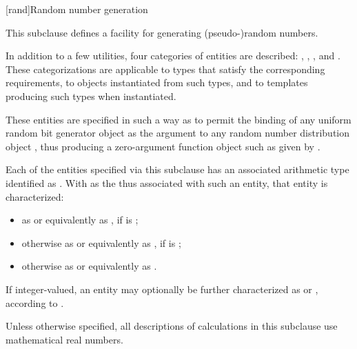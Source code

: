 [rand]{Random number generation}

%
%
%
%

\pnum
This subclause defines a facility
for generating (pseudo-)random numbers.

\pnum
In addition to a few utilities,
four categories of entities are described:
,
,
,
and
.
These categorizations are applicable
to types that satisfy the corresponding requirements,
to objects instantiated from such types,
and to templates producing such types when instantiated.
\begin{note}
 These entities are specified in such a way
 as to permit the binding
 of any uniform random bit generator object 
 as the argument
 to any random number distribution object ,
 thus producing a zero-argument function object
 such as given by
 .
\end{note}

\pnum
{}%
Each of the entities specified via this subclause
has an associated arithmetic type
identified as .
With  as the 
thus associated with such an entity,
that entity is characterized:
\begin{itemize}
 \item
   as  or equivalently as ,
   if  is ;
 \item
   otherwise
   as  or equivalently as ,
   if  is ;
 \item
   otherwise
   as  or equivalently as .
\end{itemize}
\noindent
If integer-valued,
an entity may optionally be further characterized as
 or ,
according to .

\pnum
Unless otherwise specified,
all descriptions of calculations
in this subclause
use mathematical real numbers.

